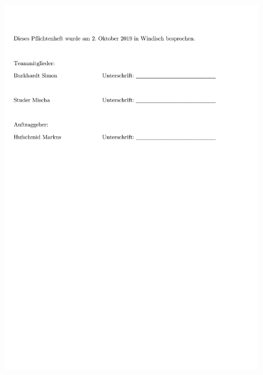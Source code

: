 \begin{appendix}
\begin{figure}[h]
	\centering
	\includegraphics[width=0.95\linewidth]{appendix/pflichtenheft (6).pdf}
\end{figure}


\end{appendix}







